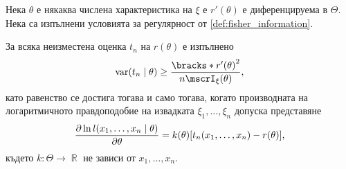 \documentclass{../../common/topic}
\begin{document}
\begin{theorem}\label{thm:rao_cramer}
  Нека \( \theta \) е някаква числена характеристика на \( \xi \) е \( r'(\theta) \) е диференцируема в \( \Theta \). Нека са изпълнени условията за регулярност от \cref{def:fisher_information}.

  За всяка неизместена оценка \( t_n \) на \( r(\theta) \) е изпълнено
  \begin{equation*}
    \var(t_n \given \theta) \geq \frac {{\bracks*{r'(\theta) }}^2} {n \mscrI_\xi(\theta)},
  \end{equation*}
  като равенство се достига тогава и само тогава, когато производната на логаритмичното правдоподобие на извадката \( \xi_1, \ldots, \xi_n \) допуска представяне
  \begin{equation*}
    \frac {\partial \ln l(x_1, \ldots, x_n \given \theta)} {\partial \theta}
    =
    k(\theta) [t_n(x_1, \ldots, x_n) - r(\theta)],
  \end{equation*}
  където \( k: \Theta \to \BbbR \) не зависи от \( x_1, \ldots, x_n \).
\end{theorem}
\end{document}
